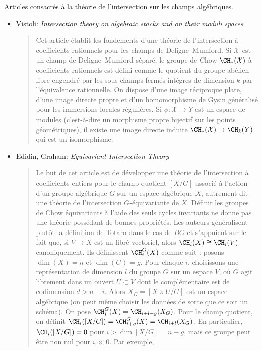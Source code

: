 \noindent
Articles consacrés à la théorie de l'intersection sur les champs algébriques.
\begin{itemize}
\item
Vistoli: \emph{Intersection theory on algebraic stacks and on their moduli
spaces} \cite{vistoli_intersection}
\begin{quote}
Cet article établit les fondements d'une théorie de l'intersection à
coefficients rationnels pour les champs de Deligne--Mumford. Si $\mathcal{X}$
est un champ de Deligne--Mumford séparé, le groupe de Chow
$\CH_*(\mathcal{X})$ à coefficients rationnels est
défini comme le quotient du groupe abélien libre engendré par les sous-champs
fermés intègres de dimension $k$ par l'équivalence rationnelle.
On dispose d'une image réciproque plate, d'une image directe propre
et d'un homomorphisme de Gysin généralisé pour les immersions locales
régulières. Si $\phi : \mathcal{X} \to Y$ est un espace de modules
(c'est-à-dire un morphisme propre bijectif sur les
points géométriques), il existe une image directe induite
$\CH_*(\mathcal{X}) \to \CH_k(Y)$
qui est un isomorphisme.
\end{quote}
\item Edidin, Graham: \emph{Equivariant Intersection Theory}
\cite{edidin-graham}
\begin{quote}
Le but de cet article est de développer une théorie de l'intersection à
coefficients entiers pour le champ quotient $[X/G]$ associé à l'action d'un
groupe algébrique $G$ sur un espace algébrique $X$, autrement dit une théorie
de l'intersection $G$-équivariante de $X$. Définir les groupes de Chow
équivariants à l'aide des seuls cycles invariants ne donne pas une théorie
possédant de bonnes propriétés. Les auteurs généralisent plutôt la définition de
Totaro dans le cas de $BG$ et s'appuient sur le fait que, si
$V \to X$ est un fibré vectoriel, alors
$\CH_i(X) \cong \CH_i(V)$ canoniquement. Ils définissent
$\CH_i^G(X)$ comme suit :
posons $\dim(X) = n$ et $\dim(G) = g$. Pour chaque $i$, choisissons une
représentation de dimension $l$ du groupe $G$ sur un espace $V$, où $G$ agit librement dans
un ouvert $U \subset V$ dont le complémentaire est de codimension
$d > n - i$. Alors $X_G = [X \times U / G]$ est un
espace algébrique (on peut même choisir les données de sorte que ce soit un
schéma). On pose
$\CH_i^G(X) = \CH_{i + l - g}(X_G)$. Pour le champ quotient, on définit
$\CH_i( [X/G]) = \CH_{i + g}^G(X) = \CH_{i + l}(X_G)$.
En particulier, $\CH_i([X/G]) = 0$ pour $i > \dim [X/G] = n - g$,
mais ce groupe peut être non nul pour $i \ll 0$. Par exemple,

\end{quote}
\end{itemize}
